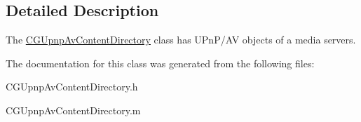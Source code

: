 \subsection{Detailed Description}
The \hyperlink{interface_c_g_upnp_av_content_directory}{C\-G\-Upnp\-Av\-Content\-Directory} class has U\-Pn\-P/\-A\-V objects of a media servers. 

The documentation for this class was generated from the following files\-:\begin{DoxyCompactItemize}
\item 
C\-G\-Upnp\-Av\-Content\-Directory.\-h\item 
C\-G\-Upnp\-Av\-Content\-Directory.\-m\end{DoxyCompactItemize}
